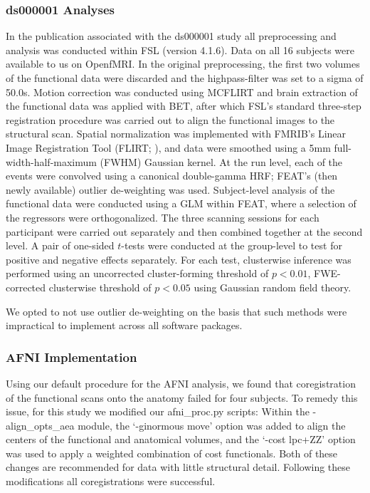\subsubsection{ds000001 Analyses}
In the publication associated with the ds000001 study all preprocessing and analysis was conducted within FSL (version 4.1.6). Data on all 16 subjects were available to us on OpenfMRI. In the original preprocessing, the first two volumes of the functional data were discarded and the highpass-filter was set to a sigma of 50.0s. Motion correction was conducted using MCFLIRT and brain extraction of the functional data was applied with BET, after which FSL's standard three-step registration procedure was carried out to align the functional images to the structural scan. Spatial normalization was implemented with FMRIB's Linear Image Registration Tool (FLIRT; \citep{Jenkinson2002-qf}), and data were smoothed using a 5mm full-width-half-maximum (FWHM) Gaussian kernel. At the run level, each of the events were convolved using a canonical double-gamma HRF; FEAT's (then newly available) outlier de-weighting was used. Subject-level analysis of the functional data were conducted using a GLM within FEAT, where a selection of the regressors were orthogonalized. The three scanning sessions for each participant were carried out separately and then combined together at the second level. A pair of one-sided $t$-tests were conducted at the group-level to test for positive and negative effects separately. For each test, clusterwise inference was performed using an uncorrected cluster-forming threshold of $p < 0.01$, FWE-corrected clusterwise threshold of $p < 0.05$ using Gaussian random field theory.

We opted to not use outlier de-weighting on the basis that such methods were impractical to implement across all software packages.

\subsubsection{AFNI Implementation}
Using our default procedure for the AFNI analysis, we found that coregistration of the functional scans onto the anatomy failed for four subjects. To remedy this issue, for this study we modified our afni\_proc.py scripts: Within the -align\_opts\_aea module, the `-ginormous move' option was added to align the centers of the functional and anatomical volumes, and the `-cost lpc+ZZ' option was used to apply a weighted combination of cost functionals. Both of these changes are recommended for data with little structural detail. Following these modifications all coregistrations were successful.

